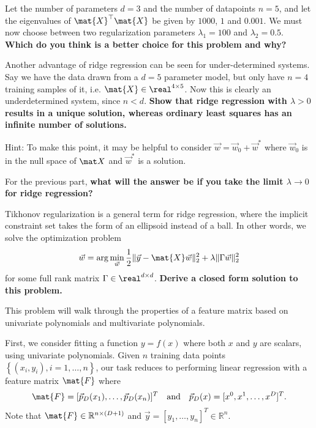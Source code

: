 \documentclass[preview]{standalone}
\begin{document}
\begin{Parts}
	

	\Part Let the number of parameters $d = 3$ and the number of datapoints $n = 5$, and let the eigenvalues of $\mat{X}^\top \mat{X}$ be given by $1000$, $1$ and $0.001$. We must now choose between two regularization parameters $\lambda_1 = 100$ and $\lambda_2 = 0.5$. {\bf Which do you think is a better choice for this problem and why?}

	
	
	\Part Another advantage of ridge regression can be seen for under-determined systems. Say we have the data drawn from a $d = 5$ parameter model, but only have $n = 4$ training samples of it, i.e. $\mat{X} \in \real^{4 \times 5}$. Now this is clearly an underdetermined system, since $n < d$. {\bf Show that ridge regression with $\lambda > 0$ results in a unique solution, whereas ordinary least squares has an infinite number of solutions.}

	Hint: To make this point, it may be helpful to consider $\vec w = \vec w_0 + \vec w^*$ where $\vec w_0$ is in the null space of $\mat X$ and $\vec w^*$ is a solution.

	

	\Part For the previous part, {\bf what will the answer be if you take the limit $\lambda \rightarrow 0$ for ridge regression? }

	

	\Part Tikhonov regularization is a general term for ridge regression, where the implicit constraint set takes the form of an ellipsoid instead of a ball. In other words, we solve the optimization problem
	\begin{align*}
		\vec{w} = \arg\min_{\vec{w}} \frac{1}{2} \| \vec{y} - \mat{X} \vec{w} \|_2^2 + \lambda \| \Gamma \vec{w}\|_2^2
	\end{align*}
	for some full rank matrix $\Gamma \in \real^{d \times d}$. {\bf Derive a closed form solution to this problem.}

	

\end{Parts}


This problem will walk through the properties of a feature matrix based on univariate polynomials and multivariate polynomials.

First, we consider fitting a function $y = f(x)$ where both $x$ and $y$ are scalars, using univariate polynomials.
Given $n$ training data points $\left\{(x_i, y_i), i=1, \ldots, n\right\}$, our task reduces to performing linear regression with a feature matrix $\mat{F}$
where
\begin{align*}
	\mat{F} = [\vec{p}_D(x_1), \ldots , \vec{p}_D(x_n)]^T \quad \text{and} \quad \vec{p}_D(x)=[x^{0},x^{1},\ldots, x^D]^T.
\end{align*}
Note that $\mat{F} \in \mathbb{R}^{n \times (D+1)}$ and $\vec{y} = [y_1, \ldots, y_n]^T \in \mathbb{R}^n$.
\end{document}
